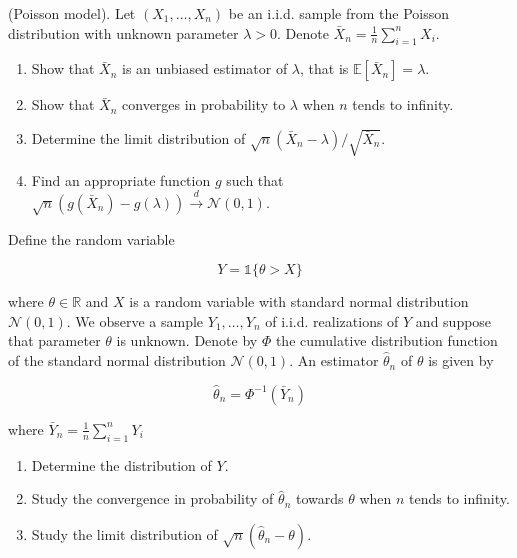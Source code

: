 \begin{Exercise}
  (Poisson model). Let $\left(X_{1}, \ldots, X_{n}\right)$ be an i.i.d. sample from the Poisson distribution with unknown parameter $\lambda>0$. Denote $\bar{X}_{n}=\frac{1}{n} \sum_{i=1}^{n} X_{i}$.

  \begin{enumerate}
    \item Show that $\bar{X}_{n}$ is an unbiased estimator of $\lambda$, that is $\mathbb{E}\left[\bar{X}_{n}\right]=\lambda$.

    \item Show that $\bar{X}_{n}$ converges in probability to $\lambda$ when $n$ tends to infinity.

    \item Determine the limit distribution of $\sqrt{n}\left(\bar{X}_{n}-\lambda\right) / \sqrt{\bar{X}_{n}}$.

    \item Find an appropriate function $g$ such that $\sqrt{n}\left(g\left(\bar{X}_{n}\right)-g(\lambda)\right) \stackrel{d}{\longrightarrow} \mathcal{N}(0,1)$.

  \end{enumerate}
\end{Exercise}


\begin{Exercise}
  Define the random variable

  $$
    Y=\mathbb{1}\{\theta>X\}
  $$

  where $\theta \in \mathbb{R}$ and $X$ is a random variable with standard normal distribution $\mathcal{N}(0,1)$. We observe a sample $Y_{1}, \ldots, Y_{n}$ of i.i.d. realizations of $Y$ and suppose that parameter $\theta$ is unknown. Denote by $\Phi$ the cumulative distribution function of the standard normal distribution $\mathcal{N}(0,1)$. An estimator $\hat{\theta}_{n}$ of $\theta$ is given by

  $$
    \hat{\theta}_{n}=\Phi^{-1}\left(\bar{Y}_{n}\right)
  $$

  where $\bar{Y}_{n}=\frac{1}{n} \sum_{i=1}^{n} Y_{i}$

  \begin{enumerate}
    \item Determine the distribution of $Y$.

    \item Study the convergence in probability of $\hat{\theta}_{n}$ towards $\theta$ when $n$ tends to infinity.

    \item Study the limit distribution of $\sqrt{n}\left(\hat{\theta}_{n}-\theta\right)$.

  \end{enumerate}
\end{Exercise}